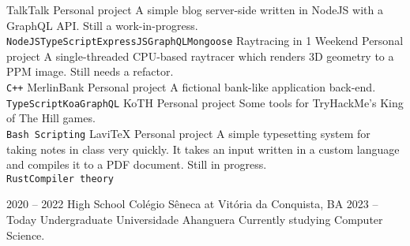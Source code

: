 \documentclass[9pt]{developercv} %
\begin{document}
\begin{entrylist}
	\entry
		{}
		{TalkTalk}
		{Personal project}
		{A simple blog server-side written in NodeJS with a GraphQL API. Still a work-in-progress.\\ \texttt{NodeJS}\slashsep\texttt{TypeScript}\slashsep\texttt{ExpressJS}\slashsep\texttt{GraphQL}\slashsep\texttt{Mongoose}}
	\entry
		{}
		{Raytracing in 1 Weekend}
		{Personal project}
		{A single-threaded CPU-based raytracer which renders 3D geometry to a PPM image. Still needs a refactor.\\ \texttt{C++}}
	\entry
		{}
		{MerlinBank}
		{Personal project}
		{A fictional bank-like application back-end.\\ \texttt{TypeScript}\slashsep\texttt{Koa}\slashsep\texttt{GraphQL}}
	\entry
		{}
		{KoTH}
		{Personal project}
		{Some tools for TryHackMe's King of The Hill games.\\ \texttt{Bash Scripting}}
	\entry
		{}
		{LaviTeX}
		{Personal project}
		{A simple typesetting system for taking notes in class very quickly. It takes an input written in a custom language and compiles it to a PDF document. Still in progress.\\ \texttt{Rust}\slashsep\texttt{Compiler theory}}
\end{entrylist}


\pagebreak


\begin{entrylist}
	\entry
		{2020 -- 2022}
		{High School}
		{Colégio Sêneca at Vitória da Conquista, BA}
		{}
	\entry
		{2023 -- Today}
		{Undergraduate}
		{Universidade Ahanguera}
		{Currently studying Computer Science.}
\end{entrylist}

\end{document}
